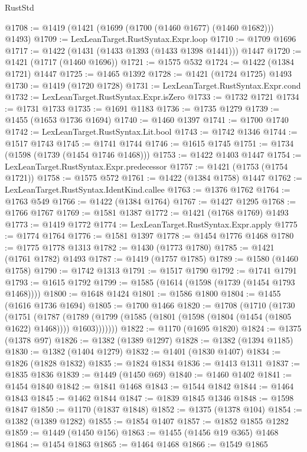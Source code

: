 \begin{lexlean}{RustStd}
\begin{coremodule}
@1708 := @1419 (@1421 (@1699 (@1700 (@1460 @1677) (@1460 @1682))) @1493)
@1709 := LexLeanTarget.RustSyntax.Expr.loop
@1710 := @1709 @1696
@1717 := @1422 (@1431 (@1433 @1393 (@1433 @1398 @1441))) @1447
@1720 := @1421 (@1717 (@1460 @1696))
@1721 := @1575 @532
@1724 := @1422 (@1384 @1721) @1447
@1725 := @1465 @1392
@1728 := @1421 (@1724 @1725) @1493
@1730 := @1419 (@1720 @1728)
@1731 := LexLeanTarget.RustSyntax.Expr.cond
@1732 := LexLeanTarget.RustSyntax.Expr.isZero
@1733 := @1732 @1721
@1734 := @1731 @1733
@1735 := @1691 @1183
@1736 := @1735 @1279
@1739 := @1455 (@1653 @1736 @1694)
@1740 := @1460 @1397
@1741 := @1700 @1740
@1742 := LexLeanTarget.RustSyntax.Lit.bool
@1743 := @1742 @1346
@1744 := @1517 @1743
@1745 := @1741 @1744
@1746 := @1615 @1745
@1751 := @1734 (@1598 (@1739 (@1454 @1746 @1468)))
@1753 := @1422 @1403 @1447
@1754 := LexLeanTarget.RustSyntax.Expr.predecessor
@1757 := @1421 (@1753 (@1754 @1721))
@1758 := @1575 @572
@1761 := @1422 (@1384 @1758) @1447
@1762 := LexLeanTarget.RustSyntax.IdentKind.callee
@1763 := @1376 @1762
@1764 := @1763 @549
@1766 := @1422 (@1384 @1764)
@1767 := @1427 @1295
@1768 := @1766 @1767
@1769 := @1581 @1387
@1772 := @1421 (@1768 @1769) @1493
@1773 := @1419 @1772
@1774 := LexLeanTarget.RustSyntax.Expr.apply
@1775 := @1774 @1764
@1776 := @1581 @1397
@1778 := @1454 @1776 @1468
@1780 := @1775 @1778 @1313
@1782 := @1430 (@1773 @1780)
@1785 := @1421 (@1761 @1782) @1493
@1787 := @1419 (@1757 @1785)
@1789 := @1580 (@1460 @1758)
@1790 := @1742 @1313
@1791 := @1517 @1790
@1792 := @1741 @1791
@1793 := @1615 @1792
@1799 := @1585 (@1614 (@1598 (@1739 (@1454 @1793 @1468))))
@1800 := @1648 @1424
@1801 := @1586 @1800
@1804 := @1455 (@1616 @1736 @1694)
@1805 := @1700 @1466
@1820 := @1708
    (@1710
      (@1730
        (@1751
          (@1787
            (@1789 (@1799 (@1585 (@1801 (@1598 (@1804 (@1454 (@1805 @1622) @1468)))) @1603)))))))
@1822 := @1170 (@1695 @1820)
@1824 := @1375 (@1378 @97)
@1826 := @1382 (@1389 @1297)
@1828 := @1382 (@1394 @1185)
@1830 := @1382 (@1404 @1279)
@1832 := @1401 (@1830 @1407)
@1834 := @1826 (@1828 @1832)
@1835 := @1824 @1834
@1836 := @1413 @1311
@1837 := @1835 @1836
@1839 := @1449 (@1450 @69)
@1840 := @1460 @1402
@1841 := @1454 @1840
@1842 := @1841 @1468
@1843 := @1544 @1842
@1844 := @1464 @1843
@1845 := @1462 @1844
@1847 := @1839 @1845 @1346
@1848 := @1598 @1847
@1850 := @1170 (@1837 @1848)
@1852 := @1375 (@1378 @104)
@1854 := @1382 (@1389 @1282)
@1855 := @1854 @1407
@1857 := @1852 @1855 @1282
@1859 := @1449 (@1450 @156)
@1863 := @1455 (@1456 @19 @365) @1468
@1864 := @1454 @1863
@1865 := @1464 @1468
@1866 := @1549 @1865

\end{coremodule}
\end{lexlean}
